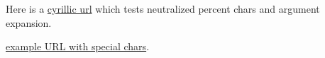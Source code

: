\documentclass{article}
\def\Dzero{D0}
\begin{document}
Here is a \href{https://bg.wikipedia.org/wiki/%\Dzero%A1%\Dzero%B8%\Dzero%BD%D1%82%\Dzero%B0%\Dzero%BA%D1%81%\Dzero%B8%D1%81}{cyrillic url}
  which tests neutralized percent chars and argument expansion.

\href{https://example.com/~\~test\\\%\#foo&a=1\&b=$$}{example URL with special chars}.

\end{document}
